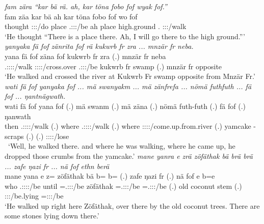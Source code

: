 \begin{exe}
	\emph{fam zära ``kar bä rä. ah, kar töna fobo fof wyak fof.''}\\
	\gll fam zäa kar bä  ah kar töna fobo fof wo fof\\ 
	thought \Sg:\Sbj:\Pst:\Pfv/do place \Med{} \Tsg.\F:\Sbj:\Nonpast:\Ipfv/be ah place high.ground \Dist.\All{} \Emph{} \Fsg:\Sbj:\Nonpast:\Ipfv/walk \Emph\\
	\trans `He thought ``There is a place there. Ah, I will go there to the high ground.'''
	\emph{yanyaka fä fof zänrita fof rä kukwrb fr zra ... mnzär fr neba.}\\
	\gll yana fä fof zäna fof  {kukwrb fr} zra (.) {mnzär fr} neba\\ 
	\Tsg.\Masc:\Sbj:\Pst:\Ipfv:\Venit/walk \Dist{} \Emph{} \Sg:\Sbj:\Pst:\Pfv:\Venit/cross.over \Emph{} \Tsg.\F:\Sbj:\Nonpast:\Ipfv/be {kukwrb fr} swamp (.) {mnzär fr} opposite\\
	\trans `He walked and crossed the river at Kukwrb Fr swamp opposite from Mnzär Fr.'
	\emph{wati fä fof yanyaka fof ... mä swanyakm ... mä zänfrefa ... nömä futhfuth ... fä fof ... ŋantnägwath.}\\
	\gll wati fä fof yana fof (.) mä swanm (.) mä zäna (.) nömä futh-futh (.) fä fof (.) ŋanwath\\ 
	then \Dist{} \Emph{} \Tsg.\Masc:\Sbj:\Pst:\Ipfv:\Venit/walk \Emph{} (.) where \Tsg.\Masc:\Sbj:\Pst:\Dur:\Venit/walk (.) where \Sg:\Sbj:\Pst:\Pfv:\Venit/come.up.from.river (.) yamcake \Redup-scraps (.) \Dist{} \Emph{} (.) \Stpl:\Sbj:\Pst:\Ipfv:\Venit/lose\\\
	\trans `Well, he walked there. and where he was walking, where he came up, he dropped those crumbs from the yamcake.'
\exi{127} 
	\emph{mane yanra e zrä zöfäthak bä brä brä ... zafe ŋazi fr ... nä fof ethn berä}\\
	\gll mane yan\stem{r}a e z= zöfäthak bä b=\stem{rä} b=\stem{rä} (.) zafe ŋazi fr (.) nä fof e b=e\\ 
	who \Tsg.\Masc:\Sbj:\Pst:\Ipfv:\Venit/be until \Prox=\Tsg.\F:\Sbj:\Nonpast:\Ipfv/be zöfäthak \Med{} \Med=\Tsg.\F:\Sbj:\Nonpast:\Ipfv/be \Med=\Tsg.\F:\Sbj:\Nonpast:\Ipfv/be (.) old coconut stem (.) \Indf{} \Emph{} \Stpl:\Sbj:\Nonpast:\Stat/be.lying \Med=\Stpl:\Sbj:\Nonpast:\Ipfv/be\\
	\trans `He walked up right here Zöfäthak, over there by the old coconut trees. There are some stones lying down there.'
\exi{128} 

\end{exe}
